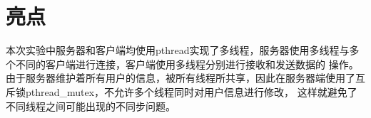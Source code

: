 \section{亮点}
本次实验中服务器和客户端均使用pthread实现了多线程，服务器使用多线程与多个不同的客户端进行连接，客户端使用多线程分别进行接收和发送数据的
操作。由于服务器维护着所有用户的信息，被所有线程所共享，因此在服务器端使用了互斥锁pthread\_mutex，不允许多个线程同时对用户信息进行修改，
这样就避免了不同线程之间可能出现的不同步问题。